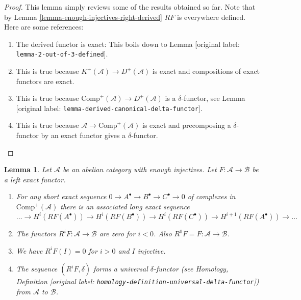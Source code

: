 \documentclass[10pt,a4paper]{article}
\theoremstyle{plain}
\newtheorem{lemma}[subsection]{Lemma}
\theoremstyle{definition}
\theoremstyle{remark}
\numberwithin{equation}{subsection}
\begin{document}
\begin{proof}
This lemma simply reviews some of the results obtained so far.
Note that by
Lemma \ref{lemma-enough-injectives-right-derived}
$RF$ is everywhere defined. Here are some references:
\begin{enumerate}
\item The derived functor is exact: This boils down to
Lemma [original label: \nolinkurl{lemma-2-out-of-3-defined}].
\item This is true because $K^{+}(\mathcal{A}) \to D^{+}(\mathcal{A})$
is exact and compositions of exact functors are exact.
\item This is true because
$\text{Comp}^{+}(\mathcal{A}) \to D^{+}(\mathcal{A})$ is
a $\delta$-functor, see
Lemma [original label: \nolinkurl{lemma-derived-canonical-delta-functor}].
\item This is true because $\mathcal{A} \to \text{Comp}^{+}(\mathcal{A})$
is exact and precomposing a $\delta$-functor by an exact functor gives
a $\delta$-functor.
\end{enumerate}
\end{proof}

\begin{lemma}
\label{lemma-higher-derived-functors}
Let $\mathcal{A}$ be an abelian category with enough injectives.
Let $F : \mathcal{A} \to \mathcal{B}$ be a left exact functor.
\begin{enumerate}
\item For any short exact sequence
$0 \to A^\bullet \to B^\bullet \to C^\bullet \to 0$
of complexes in $\text{Comp}^{+}(\mathcal{A})$ there
is an associated long exact sequence
$$
\ldots \to
H^i(RF(A^\bullet)) \to
H^i(RF(B^\bullet)) \to
H^i(RF(C^\bullet)) \to
H^{i + 1}(RF(A^\bullet)) \to \ldots
$$
\item The functors $R^iF : \mathcal{A} \to \mathcal{B}$
are zero for $i < 0$. Also $R^0F = F : \mathcal{A} \to \mathcal{B}$.
\item We have $R^iF(I) = 0$ for $i > 0$ and $I$ injective.
\item The sequence $(R^iF, \delta)$ forms a universal $\delta$-functor (see
Homology, Definition [original label: \nolinkurl{homology-definition-universal-delta-functor}])
from $\mathcal{A}$ to $\mathcal{B}$.
\end{enumerate}
\end{lemma}
\end{document}
